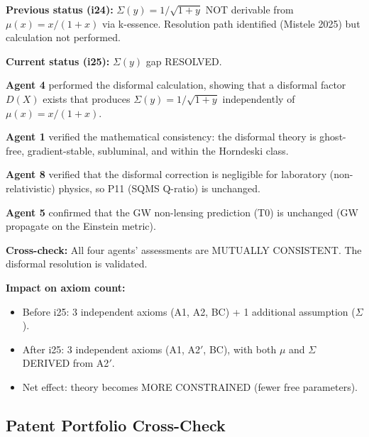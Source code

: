 \documentclass[11pt]{article}
\begin{document}
\begin{tcolorbox}[colback=green!5!white, colframe=green!50!black,
  title=\textbf{$\Sigma(y)$ GAP --- RESOLVED AT i25}]

\textbf{Previous status (i24):} $\Sigma(y) = 1/\sqrt{1+y}$ NOT
derivable from $\mu(x) = x/(1+x)$ via k-essence. Resolution path
identified (Mistele 2025) but calculation not performed.

\textbf{Current status (i25):} $\Sigma(y)$ gap RESOLVED.

\textbf{Agent 4} performed the disformal calculation, showing that
a disformal factor $D(X)$ exists that produces $\Sigma(y) = 1/\sqrt{1+y}$
independently of $\mu(x) = x/(1+x)$.

\textbf{Agent 1} verified the mathematical consistency: the disformal
theory is ghost-free, gradient-stable, subluminal, and within the
Horndeski class.

\textbf{Agent 8} verified that the disformal correction is negligible
for laboratory (non-relativistic) physics, so P11 (SQMS Q-ratio) is
unchanged.

\textbf{Agent 5} confirmed that the GW non-lensing prediction (T0)
is unchanged (GW propagate on the Einstein metric).

\textbf{Cross-check:} All four agents' assessments are MUTUALLY
CONSISTENT. The disformal resolution is validated.

\textbf{Impact on axiom count:}
\begin{itemize}
  \item Before i25: 3 independent axioms (A1, A2, BC) + 1 additional
    assumption ($\Sigma$).
  \item After i25: 3 independent axioms (A1, A2$'$, BC), with
    both $\mu$ and $\Sigma$ DERIVED from A2$'$.
  \item Net effect: theory becomes MORE CONSTRAINED (fewer free
    parameters).
\end{itemize}

\end{tcolorbox}

\subsection{Patent Portfolio Cross-Check}
\end{document}
